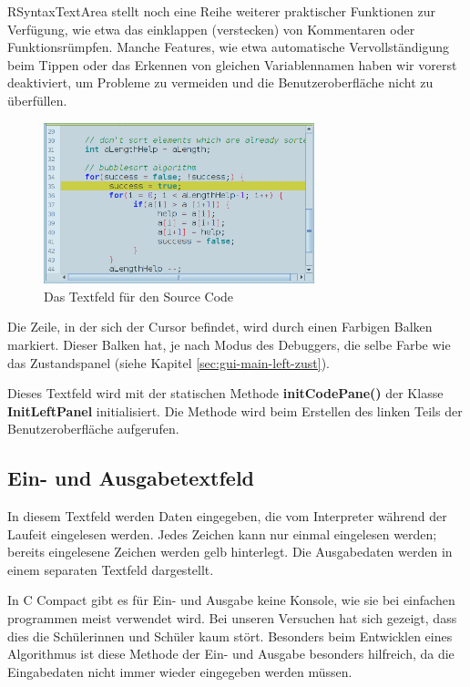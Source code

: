 RSyntaxTextArea stellt noch eine Reihe weiterer praktischer Funktionen zur Verfügung, wie etwa das einklappen (verstecken) von Kommentaren oder Funktionsrümpfen. Manche Features, wie etwa automatische Vervollständigung beim Tippen oder das Erkennen von gleichen Variablennamen haben wir vorerst deaktiviert, um Probleme zu vermeiden und die Benutzeroberfläche nicht zu überfüllen.

\begin{figure}[htbp] 
  \centering
     \includegraphics[width=0.7\textwidth]{./media/images/gui/main/CCompact-gui-left-code.png}
  \caption{Das Textfeld für den Source Code}
  \label{fig:gui-main-left-code}
\end{figure}

Die Zeile, in der sich der Cursor befindet, wird durch einen Farbigen Balken markiert. Dieser Balken hat, je nach Modus des Debuggers, die selbe Farbe wie das Zustandspanel (siehe Kapitel \ref{sec:gui-main-left-zust}).

Dieses Textfeld wird mit der statischen Methode \textbf{initCodePane()} der Klasse \textbf{InitLeftPanel} initialisiert. Die Methode wird beim Erstellen des linken Teils der Benutzeroberfläche aufgerufen.

\subsection{Ein- und Ausgabetextfeld}
\label{sec:gui-main-left-io}

In diesem Textfeld werden Daten eingegeben, die vom Interpreter während der Laufeit eingelesen werden. Jedes Zeichen kann nur einmal eingelesen werden; bereits eingelesene Zeichen werden gelb hinterlegt. Die Ausgabedaten werden in einem separaten Textfeld dargestellt.

In C Compact gibt es für Ein- und Ausgabe keine Konsole, wie sie bei einfachen programmen meist verwendet wird. Bei unseren Versuchen hat sich gezeigt, dass dies die Schülerinnen und Schüler kaum stört. Besonders beim Entwicklen eines Algorithmus ist diese Methode der Ein- und Ausgabe besonders hilfreich, da die Eingabedaten nicht immer wieder eingegeben werden müssen.

